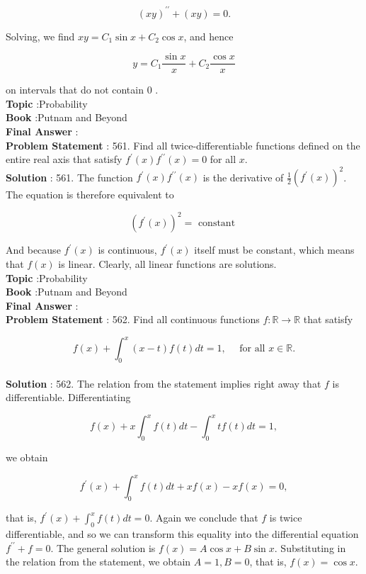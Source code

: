 \documentclass[10pt]{article}
\begin{document}
$$
(x y)^{\prime \prime}+(x y)=0 .
$$

Solving, we find $x y=C_{1} \sin x+C_{2} \cos x$, and hence

$$
y=C_{1} \frac{\sin x}{x}+C_{2} \frac{\cos x}{x}
$$

on intervals that do not contain 0 .
\\
\textbf{Topic} :Probability\\
\textbf{Book} :Putnam and Beyond\\
\textbf{Final Answer} :\\


\textbf{Problem Statement} :
561. Find all twice-differentiable functions defined on the entire real axis that satisfy $f^{\prime}(x) f^{\prime \prime}(x)=0$ for all $x$.
\\
\textbf{Solution} :
561. The function $f^{\prime}(x) f^{\prime \prime}(x)$ is the derivative of $\frac{1}{2}\left(f^{\prime}(x)\right)^{2}$. The equation is therefore equivalent to

$$
\left(f^{\prime}(x)\right)^{2}=\text { constant }
$$

And because $f^{\prime}(x)$ is continuous, $f^{\prime}(x)$ itself must be constant, which means that $f(x)$ is linear. Clearly, all linear functions are solutions. 
\\
\textbf{Topic} :Probability\\
\textbf{Book} :Putnam and Beyond\\
\textbf{Final Answer} :\\


\textbf{Problem Statement} :
562. Find all continuous functions $f: \mathbb{R} \rightarrow \mathbb{R}$ that satisfy

$$
f(x)+\int_{0}^{x}(x-t) f(t) d t=1, \quad \text { for all } x \in \mathbb{R} .
$$
\\
\textbf{Solution} :
562. The relation from the statement implies right away that $f$ is differentiable. Differentiating

$$
f(x)+x \int_{0}^{x} f(t) d t-\int_{0}^{x} t f(t) d t=1,
$$

we obtain

$$
f^{\prime}(x)+\int_{0}^{x} f(t) d t+x f(x)-x f(x)=0,
$$

that is, $f^{\prime}(x)+\int_{0}^{x} f(t) d t=0$. Again we conclude that $f$ is twice differentiable, and so we can transform this equality into the differential equation $f^{\prime \prime}+f=0$. The general solution is $f(x)=A \cos x+B \sin x$. Substituting in the relation from the statement, we obtain $A=1, B=0$, that is, $f(x)=\cos x$.
\end{document}

